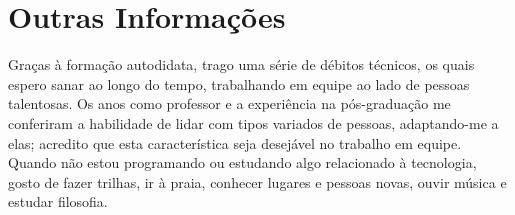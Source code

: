 \documentclass[letterpaper]{twentysecondcv} %
\begin{document}

\section{Outras Informações}

Graças à formação autodidata, trago uma série de débitos técnicos, os
quais espero sanar ao longo do tempo, trabalhando em equipe ao lado de
pessoas talentosas. Os anos como professor e a experiência na
pós-graduação me conferiram a habilidade de lidar com tipos variados de
pessoas, adaptando-me a elas; acredito que esta característica seja
desejável no trabalho em equipe. Quando não estou programando ou
estudando algo relacionado à tecnologia, gosto de fazer trilhas, ir à
praia, conhecer lugares e pessoas novas, ouvir música e estudar
filosofia.






\end{document}
